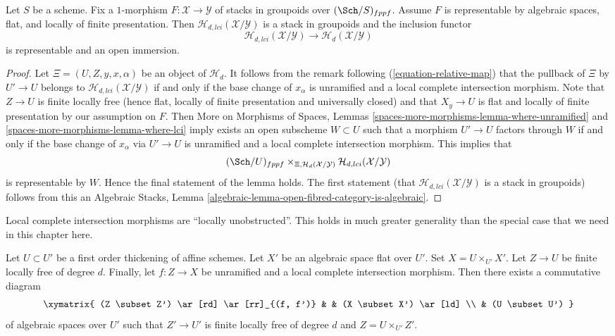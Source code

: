 \begin{lemma}
\label{lemma-lci-locus-stack-in-groupoids}
Let $S$ be a scheme. Fix a $1$-morphism
$F : \mathcal{X} \longrightarrow \mathcal{Y}$
of stacks in groupoids over $(\Sch/S)_{fppf}$.
Assume $F$ is representable by algebraic spaces, flat, and locally
of finite presentation. Then $\mathcal{H}_{d, lci}(\mathcal{X}/\mathcal{Y})$
is a stack in groupoids and the inclusion functor
$$
\mathcal{H}_{d, lci}(\mathcal{X}/\mathcal{Y})
\longrightarrow
\mathcal{H}_d(\mathcal{X}/\mathcal{Y})
$$
is representable and an open immersion.
\end{lemma}

\begin{proof}
Let $\Xi = (U, Z, y, x, \alpha)$ be an object of $\mathcal{H}_d$. It follows
from the remark following
(\ref{equation-relative-map})
that the pullback of $\Xi$ by $U' \to U$ belongs to
$\mathcal{H}_{d, lci}(\mathcal{X}/\mathcal{Y})$ if and only if the base
change of $x_\alpha$ is unramified and a local complete intersection morphism.
Note that $Z \to U$ is finite locally free (hence flat, locally of
finite presentation and universally closed) and that $X_y \to U$ is
flat and locally of finite presentation by our assumption on $F$. Then
More on Morphisms of Spaces, Lemmas
\ref{spaces-more-morphisms-lemma-where-unramified} and
\ref{spaces-more-morphisms-lemma-where-lci}
imply exists an open subscheme $W \subset U$ such that a morphism
$U' \to U$ factors through $W$ if and only if the base change of
$x_\alpha$ via $U' \to U$ is unramified and a local complete intersection
morphism. This implies that
$$
(\Sch/U)_{fppf}
\times_{\Xi, \mathcal{H}_d(\mathcal{X}/\mathcal{Y})}
\mathcal{H}_{d, lci}(\mathcal{X}/\mathcal{Y})
$$
is representable by $W$. Hence the final statement of the lemma
holds. The first statement (that
$\mathcal{H}_{d, lci}(\mathcal{X}/\mathcal{Y})$ is a stack in groupoids)
follows from this an
Algebraic Stacks,
Lemma \ref{algebraic-lemma-open-fibred-category-is-algebraic}.
\end{proof}

\noindent
Local complete intersection morphisms are ``locally unobstructed''.
This holds in much greater generality than the special case
that we need in this chapter here.

\begin{lemma}
\label{lemma-lci-unobstructed}
Let $U \subset U'$ be a first order thickening of affine schemes.
Let $X'$ be an algebraic space flat over $U'$. Set $X = U \times_{U'} X'$.
Let $Z \to U$ be finite locally free of degree $d$. Finally, let
$f : Z \to X$ be unramified and a local complete intersection morphism.
Then there exists a commutative diagram
$$
\xymatrix{
(Z \subset Z') \ar[rd] \ar[rr]_{(f, f')} & & (X \subset X') \ar[ld] \\
& (U \subset U')
}
$$
of algebraic spaces over $U'$ such that $Z' \to U'$ is finite locally free
of degree $d$ and $Z = U \times_{U'} Z'$.
\end{lemma}

